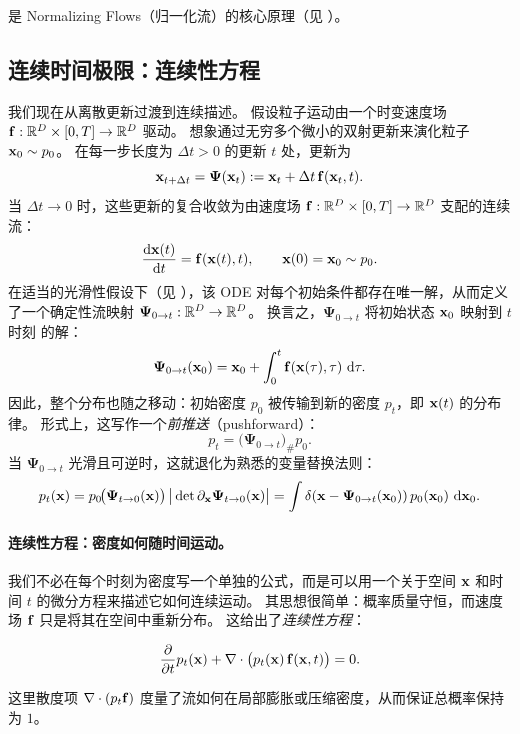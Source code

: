  是 Normalizing Flows（归一化流）的核心原理（见 ）。

\clearpage
\newpage

\subsection{连续时间极限：连续性方程}\label{subsec:cov-continuity-eq} 



我们现在从离散更新过渡到连续描述。  
假设粒子运动由一个时变速度场 ${\mathbf{f}}:\mathbb{R}^D \times [0,T]\to \mathbb{R}^D$ 驱动。  
想象通过无穷多个微小的双射更新来演化粒子 ${\mathbf{x}}_0 \sim p_0$。  
在每一步长度为 $\Delta t>0$ 的更新 $t$ 处，更新为
\[
{\mathbf{x}}_{t+\Delta t} = \bm{\Psi}({\mathbf{x}}_t) 
:= {\mathbf{x}}_t + \Delta t\, {\mathbf{f}}({\mathbf{x}}_t, t).
\]
当 $\Delta t \to 0$ 时，这些更新的复合收敛为由速度场 ${\mathbf{f}}:\mathbb{R}^D \times [0,T]\to \mathbb{R}^D$ 支配的连续流：
\begin{align}\label{eq:ode-f-continuity}
    \frac{\mathop{}\!\mathrm{d} {\mathbf{x}}(t)}{\mathop{}\!\mathrm{d} t} = {\mathbf{f}}({\mathbf{x}}(t), t),
    \qquad {\mathbf{x}}(0) = {\mathbf{x}}_0 \sim p_0.
\end{align}
在适当的光滑性假设下（见 ），该 ODE 对每个初始条件都存在唯一解，从而定义了一个确定性流映射
$\bm{\Psi}_{0\to t}:\mathbb{R}^D \to \mathbb{R}^D$。  
换言之，$\bm{\Psi}_{0\to t}$ 将初始状态 ${\mathbf{x}}_0$ 映射到 $t$ 时刻  的解：
\[
\bm{\Psi}_{0\to t}({\mathbf{x}}_0) 
= {\mathbf{x}}_0 + \int_{0}^{t} {\mathbf{f}}({\mathbf{x}}(\tau), \tau)\,\mathop{}\!\mathrm{d}\tau.
\]
因此，整个分布也随之移动：初始密度 $p_0$ 被传输到新的密度 $p_t$，即 ${\mathbf{x}}(t)$ 的分布律。  
形式上，这写作一个\emph{前推送}（pushforward）：
\[
p_t = \big(\bm{\Psi}_{0\to t}\big)_{\#} p_0.
\]
当 $\bm{\Psi}_{0\to t}$ 光滑且可逆时，这就退化为熟悉的变量替换法则：
\[
p_t({\mathbf{x}}) 
= p_0\!\big(\bm{\Psi}_{t\to 0}({\mathbf{x}})\big)\,
   \big|\det \partial_{\mathbf{x}}\bm{\Psi}_{t\to 0}({\mathbf{x}})\big|
= \int \delta\!\left({\mathbf{x}} - \bm{\Psi}_{0\to t}({\mathbf{x}}_0)\right) 
   p_0({\mathbf{x}}_0)\,\mathop{}\!\mathrm{d}{\mathbf{x}}_0. 
\]

\paragraph{连续性方程：密度如何随时间运动。}
我们不必在每个时刻为密度写一个单独的公式，而是可以用一个关于空间 ${\mathbf{x}}$ 和时间 $t$ 的微分方程来描述它如何连续运动。
其思想很简单：概率质量守恒，而速度场 ${\mathbf{f}}$ 只是将其在空间中重新分布。  
这给出了\emph{连续性方程}：
\begin{mdframed}
\begin{align}\label{eq:continuity-cov}
    \frac{\partial}{\partial t} p_t({\mathbf{x}}) 
    + \nabla \cdot \big( p_t({\mathbf{x}})\,{\mathbf{f}}({\mathbf{x}}, t) \big) = 0.
\end{align}
\end{mdframed}
这里散度项 $\nabla \cdot (p_t {\mathbf{f}})$ 度量了流如何在局部膨胀或压缩密度，从而保证总概率保持为 $1$。

